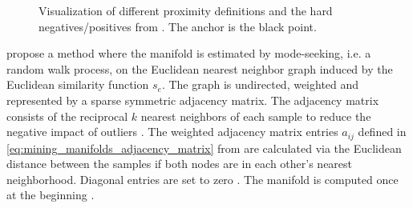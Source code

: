 \begin{figure}[h]%
    \centering
    \qquad
    \qquad
    \qquad

    \caption{Visualization of different proximity definitions and 
    the hard negatives/positives from \citet{mining_manifolds_2018}.
    The anchor is the black point.}%
    \label{fig:mining_manifolds_vis}%
\end{figure}


\citet{mining_manifolds_2018} propose a method where the manifold is estimated by mode-seeking, i.e. a random walk process, 
on the Euclidean nearest neighbor graph induced by the Euclidean similarity function $s_e$.
The graph is undirected, weighted and represented by a sparse symmetric adjacency matrix.
The adjacency matrix consists of the reciprocal $k$ nearest neighbors of each sample to reduce the negative impact of outliers \citet{diffusion_2017,mining_manifolds_2018,fast_2018}.
The weighted adjacency matrix entries $a_{ij}$ defined in \eqref{eq:mining_manifolds_adjacency_matrix} from \citet{mining_manifolds_2018} 
are calculated via the Euclidean distance between the samples if both nodes are in each other's nearest neighborhood.
Diagonal entries are set to zero \citet{mining_manifolds_2018,fast_2018}.
The manifold is computed once at the beginning \citet{mining_manifolds_2018}.

